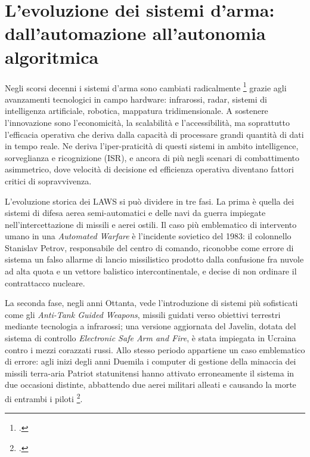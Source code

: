 \documentclass[a4paper,12pt]{report}
\begin{document}
\section{L'evoluzione dei sistemi d'arma: dall'automazione all'autonomia algoritmica}
 
Negli scorsi decenni i sistemi d'arma sono cambiati radicalmente
\footcite{longpre_2022} grazie agli avanzamenti tecnologici in campo hardware:
infrarossi, radar, sistemi di intelligenza artificiale, robotica, mappatura
tridimensionale. A sostenere l'innovazione sono l'economicità, la scalabilità e
l'accessibilità, ma soprattutto l'efficacia operativa che deriva dalla capacità
di processare grandi quantità di dati in tempo reale. Ne deriva l'iper-praticità
di questi sistemi in ambito intelligence, sorveglianza e ricognizione (ISR), e
ancora di più negli scenari di combattimento asimmetrico, dove velocità di
decisione ed efficienza operativa diventano fattori critici di sopravvivenza.
 
L'evoluzione storica dei LAWS si può dividere in tre fasi. La prima è quella dei
sistemi di difesa aerea semi-automatici e delle navi da guerra impiegate
nell'intercettazione di missili e aerei ostili. Il caso più emblematico di
intervento umano in una \textit{Automated Warfare} è l'incidente sovietico del
1983: il colonnello Stanislav Petrov, responsabile del centro di comando,
riconobbe come errore di sistema un falso allarme di lancio missilistico
prodotto dalla confusione fra nuvole ad alta quota e un vettore balistico
intercontinentale, e decise di non ordinare il contrattacco nucleare.
 
La seconda fase, negli anni Ottanta, vede l'introduzione di sistemi più
sofisticati come gli \textit{Anti-Tank Guided Weapons}, missili guidati verso
obiettivi terrestri mediante tecnologia a infrarossi; una versione aggiornata
del Javelin, dotata del sistema di controllo \textit{Electronic Safe Arm and
Fire}, è stata impiegata in Ucraina contro i mezzi corazzati russi. Allo stesso
periodo appartiene un caso emblematico di errore: agli inizi degli anni Duemila
i computer di gestione della minaccia dei missili terra-aria Patriot statunitensi
hanno attivato erroneamente il sistema in due occasioni distinte, abbattendo due
aerei militari alleati e causando la morte di entrambi i piloti
\footcite{horowitz_kahn_2024}.
 
\end{document}
